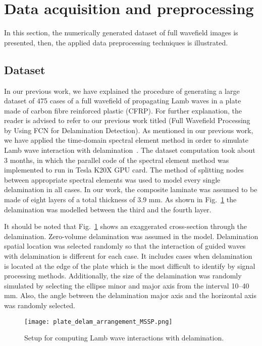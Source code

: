 \section{Data acquisition and preprocessing }
\label{section:Data_acquisition_and_preprocessing}
In this section, the numerically generated dataset of full wavefield images is presented, then, the applied data preprocessing techniques is illustrated. 
\subsection{Dataset}
In our previous work, we have explained the procedure of generating a large dataset of 475 cases of a full wavefield of propagating Lamb waves in a plate made of carbon fibre reinforced plastic (CFRP). 
For further explanation, the reader is advised to refer to our previous work titled (Full Wavefield Processing by Using FCN for Delamination Detection).
As mentioned in our previous work, we have applied the time-domain spectral element method in order to simulate Lamb wave interaction with delamination~\cite{Kudela2020}. 
The dataset computation took about 3 months, in which the parallel code of the spectral element method was implemented to run in Tesla K20X GPU card.
The method of splitting nodes between appropriate spectral elements was used to model every single delamination in all cases.
In our work, the composite laminate was assumed to be made of eight layers of a total thickness of \(3.9\) mm.
As shown in Fig.~\ref{fig:plate_setup} the delamination was modelled between the third and the fourth layer.


It should be noted that Fig.~\ref{fig:plate_setup} shows an exaggerated cross-section through the delamination. 
Zero-volume delamination was assumed in the model. 
Delamination spatial location was selected randomly so that the interaction of guided waves with delamination is different for each case.
It includes cases when delamination is located at the edge of the plate which is the most difficult to identify by signal processing methods.
Additionally, the size of the delamination was randomly simulated by selecting the ellipse minor and major axis from the interval 10--40 mm.
Also, the angle between the delamination major axis and the horizontal axis was randomly selected.

\begin{figure}
	\centering
	\texttt{[image: plate\_delam\_arrangement\_MSSP.png]}
	\caption{Setup for computing Lamb wave interactions with delamination.}
	\label{fig:plate_setup}
\end{figure}	
	
